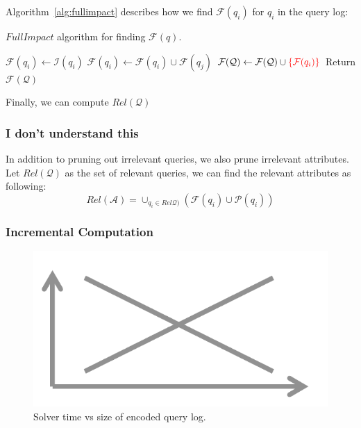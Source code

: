 Algorithm~\ref{alg:fullimpact} describes how we find
$\mathcal{F}(q_i)$ for $q_i$ in the query log:

\begin{algorithm}[htbp]
\caption{$FullImpact$ algorithm for finding $\mathcal{F}(q)$.}
\label{alg:fullimpact}
\begin{algorithmic}
\STATE $\mathcal{F}(q_i) \leftarrow \mathcal{I}(q_i)$
\STATE $\mathcal{F}(q_i) \leftarrow \mathcal{F}(q_i) \cup \mathcal{F}(q_j)$
\ENDIF
\ENDFOR
\STATE $\mathcal{F}(\mathcal{Q}) \leftarrow \mathcal{F}(\mathcal{Q}) \cup {\textcolor{red}{\{\mathcal{F}(q_i)\}}}$
\STATE Return $\mathcal{F}(\mathcal{Q})$
\end{algorithmic}
\end{algorithm}

Finally, we can compute $Rel\mathcal{(Q)}$



\subsubsection{I don't understand this}


In addition to pruning out irrelevant queries,
we also prune irrelevant attributes. \\
Let $Rel\mathcal{(Q)}$ as the set of 
relevant queries, we can find the relevant 
attributes as following:
\[Rel\mathcal{(A)} = \cup_{q_i \in Rel\mathcal{Q)}} 
(\mathcal{F}(q_i)\cup \mathcal{P}(q_i)) \]



\subsubsection{Incremental Computation}

\begin{figure}[t]
  \centering
  \includegraphics[width=.4\textwidth]{figures/placeholder}
  \caption{Solver time vs size of encoded query log.}
  \label{fig:badscaling}
\end{figure}

